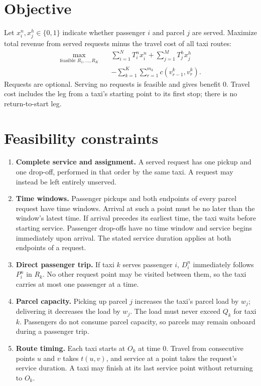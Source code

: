 \documentclass[11pt,a4paper]{article}
\begin{document}
\section{Objective}

Let $x_i^n,x_j^h\in\{0,1\}$ indicate whether passenger $i$ and parcel $j$ are
served. Maximize total revenue from served requests minus the travel cost of all
taxi routes:
\[
\begin{aligned}
    \max_{\text{feasible }R_1,\ldots,R_K}\quad
    &\sum_{i=1}^{N} T_i^n x_i^n
     +\sum_{j=1}^{M} T_j^h x_j^h \\
    &-\sum_{k=1}^{K}\sum_{r=1}^{m_k} c(v_{r-1}^k,v_r^k).
\end{aligned}
\]
Requests are optional. Serving no requests is feasible and gives benefit $0$.
Travel cost includes the leg from a taxi's starting point to its first stop;
there is no return-to-start leg.

\section{Feasibility constraints}

\begin{enumerate}
    \item \textbf{Complete service and assignment.} A served request has one
    pickup and one drop-off, performed in that order by the same taxi. A request
    may instead be left entirely unserved.

    \item \textbf{Time windows.} Passenger pickups and both endpoints of every
    parcel request have time windows. Arrival at such a point must be no later
    than the window's latest time. If arrival precedes its earliest time, the
    taxi waits before starting service. Passenger drop-offs have no time window
    and service begins immediately upon arrival. The stated service duration
    applies at both endpoints of a request.

    \item \textbf{Direct passenger trip.} If taxi $k$ serves passenger $i$,
    $D_i^n$ immediately follows $P_i^n$ in $R_k$. No other request point may
    be visited between them, so the taxi carries at most one passenger at a
    time.

    \item \textbf{Parcel capacity.} Picking up parcel $j$ increases the taxi's
    parcel load by $w_j$; delivering it decreases the load by $w_j$. The load
    must never exceed $Q_k$ for taxi $k$. Passengers do not consume parcel
    capacity, so parcels may remain onboard during a passenger trip.

    \item \textbf{Route timing.} Each taxi starts at $O_k$ at time $0$. Travel
    from consecutive points $u$ and $v$ takes $t(u,v)$, and service at a point
    takes the request's service duration. A taxi may finish at its last service
    point without returning to $O_k$.
\end{enumerate}
\end{document}
